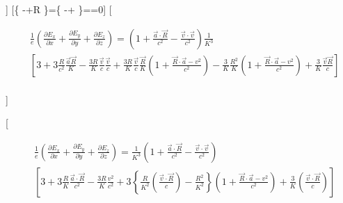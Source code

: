 \documentclass[11pt]{article}
\begin{document}
{]} {[}\left\{
-+R
\right\}=\left\{
-+
\right\}==0{]}
{[}

\begin{align}
  & \frac{1}{e}\left( \frac{\partial {{E}_{x}}}{\partial x}+\frac{\partial {{E}_{y}}}{\partial y}+\frac{\partial {{E}_{z}}}{\partial z} \right)=\left( 1+\frac{\overrightarrow{a}\cdot \overrightarrow{R}}{{{c}^{2}}}-\frac{\overrightarrow{v}\cdot \overrightarrow{v}}{{{c}^{2}}} \right)\frac{1}{{{K}^{3}}} \\ 
 & \left[ 3+3\frac{R}{{{c}^{2}}}\frac{\overrightarrow{a}\overrightarrow{R}}{K}-\frac{3R}{K}\frac{\overrightarrow{v}}{c}\frac{\overrightarrow{v}}{c}+\frac{3R}{K}\frac{\overrightarrow{v}}{c}\frac{\overrightarrow{R}}{K}\left( 1+\frac{\overrightarrow{R}\cdot \overrightarrow{a}-{{v}^{2}}}{{{c}^{2}}} \right)-\frac{3}{K}\frac{{{R}^{2}}}{K}\left( 1+\frac{\overrightarrow{R}\cdot \overrightarrow{a}-{{v}^{2}}}{{{c}^{2}}} \right)+\frac{3}{K}\frac{\overrightarrow{v}\overrightarrow{R}}{c} \right] \\ 
\end{align}

{]}

{[}

\begin{align}
  & \frac{1}{e}\left( \frac{\partial {{E}_{x}}}{\partial x}+\frac{\partial {{E}_{y}}}{\partial y}+\frac{\partial {{E}_{z}}}{\partial z} \right)=\frac{1}{{{K}^{3}}}\left( 1+\frac{\overrightarrow{a}\cdot \overrightarrow{R}}{{{c}^{2}}}-\frac{\overrightarrow{v}\cdot \overrightarrow{v}}{{{c}^{2}}} \right) \\ 
 & \left[ 3+3\frac{R}{K}\frac{\overrightarrow{a}\cdot \overrightarrow{R}}{{{c}^{2}}}-\frac{3R}{K}\frac{{{v}^{2}}}{{{c}^{2}}}+3\left\{ \frac{R}{{{K}^{2}}}\left( \frac{\overrightarrow{v}\cdot \overrightarrow{R}}{c} \right)-\frac{{{R}^{2}}}{{{K}^{2}}} \right\}\left( 1+\frac{\overrightarrow{R}\cdot \overrightarrow{a}-{{v}^{2}}}{{{c}^{2}}} \right)+\frac{3}{K}\left( \frac{\overrightarrow{v}\cdot \overrightarrow{R}}{c} \right) \right] \\ 
\end{align}
\end{document}
